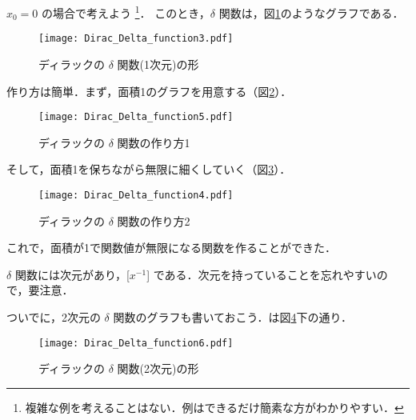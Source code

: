                         $x_{0} = 0$ の場合で考えよう
                                \footnote{
                                    複雑な例を考えることはない．例はできるだけ簡素な方がわかりやすい．
                                }．
            このとき，$\delta$ 関数は，図\ref{fig:delta_f2}のようなグラフである．
                \begin{figure}[hbt]
                    \begin{center}
                        \texttt{[image: Dirac\_Delta\_function3.pdf]}
                        \caption{ディラックの $\delta$ 関数(1次元)の形}
                        \label{fig:delta_f2}
                    \end{center}
                \end{figure}

                        作り方は簡単．まず，面積1のグラフを用意する（図\ref{fig:delta_f24}）．
                \begin{figure}[hbt]
                    \begin{center}
                        \texttt{[image: Dirac\_Delta\_function5.pdf]}
                        \caption{ディラックの $\delta$ 関数の作り方1}
                        \label{fig:delta_f24}
                    \end{center}
                \end{figure}

                        そして，面積1を保ちながら無限に細くしていく（図\ref{fig:delta_f33}）．
                \begin{figure}[hbt]
                    \begin{center}
                        \texttt{[image: Dirac\_Delta\_function4.pdf]}
                        \caption{ディラックの $\delta$ 関数の作り方2}
                        \label{fig:delta_f33}
                    \end{center}
                \end{figure}
                        これで，面積が1で関数値が無限になる関数を作ることができた．

            $\delta$ 関数には次元があり，[$x^{-1}$] である．次元を持っていることを忘れやすいので，要注意．

                        ついでに，2次元の $\delta$ 関数のグラフも書いておこう．は図\ref{fig:delta_f66}下の通り．
                \begin{figure}[hbt]
                    \begin{center}
                        \texttt{[image: Dirac\_Delta\_function6.pdf]}
                        \caption{ディラックの $\delta$ 関数(2次元)の形}
                        \label{fig:delta_f66}
                    \end{center}
                \end{figure}

